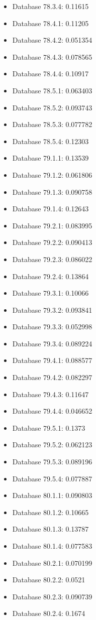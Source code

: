 \begin{itemize}
\item Database 78.3.4: 0.11615
\item Database 78.4.1: 0.11205
\item Database 78.4.2: 0.051354
\item Database 78.4.3: 0.078565
\item Database 78.4.4: 0.10917
\item Database 78.5.1: 0.063403
\item Database 78.5.2: 0.093743
\item Database 78.5.3: 0.077782
\item Database 78.5.4: 0.12303
\item Database 79.1.1: 0.13539
\item Database 79.1.2: 0.061806
\item Database 79.1.3: 0.090758
\item Database 79.1.4: 0.12643
\item Database 79.2.1: 0.083995
\item Database 79.2.2: 0.090413
\item Database 79.2.3: 0.086022
\item Database 79.2.4: 0.13864
\item Database 79.3.1: 0.10066
\item Database 79.3.2: 0.093841
\item Database 79.3.3: 0.052998
\item Database 79.3.4: 0.089224
\item Database 79.4.1: 0.088577
\item Database 79.4.2: 0.082297
\item Database 79.4.3: 0.11647
\item Database 79.4.4: 0.046652
\item Database 79.5.1: 0.1373
\item Database 79.5.2: 0.062123
\item Database 79.5.3: 0.089196
\item Database 79.5.4: 0.077887
\item Database 80.1.1: 0.090803
\item Database 80.1.2: 0.10665
\item Database 80.1.3: 0.13787
\item Database 80.1.4: 0.077583
\item Database 80.2.1: 0.070199
\item Database 80.2.2: 0.0521
\item Database 80.2.3: 0.090739
\item Database 80.2.4: 0.1674

\end{itemize}
